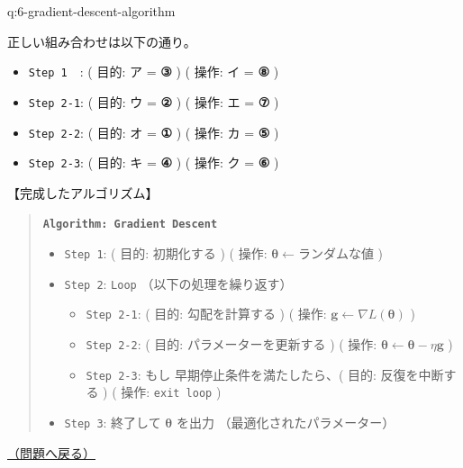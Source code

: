 \documentclass[
  pandoc]{bxjsarticle}
\providecommand{\tightlist}{%
  \setlength{\itemsep}{0pt}\setlength{\parskip}{0pt}}
\begin{document}
\begin{answerbox}[phantomlabel=a:6-gradient-descent-algorithm]{q:6-gradient-descent-algorithm}

正しい組み合わせは以下の通り。

\begin{itemize}
\tightlist
\item
  \texttt{Step\ 1}　: ( 目的: ア = \textbf{③} ) \quad ( 操作: イ =
  \textbf{⑧} )
\item
  \texttt{Step\ 2-1}: ( 目的: ウ = \textbf{②} ) \quad ( 操作: エ =
  \textbf{⑦} )
\item
  \texttt{Step\ 2-2}: ( 目的: オ = \textbf{①} ) \quad ( 操作: カ =
  \textbf{⑤} )
\item
  \texttt{Step\ 2-3}: ( 目的: キ = \textbf{④} ) \quad ( 操作: ク =
  \textbf{⑥} )
\end{itemize}

【完成したアルゴリズム】

\begin{quote}
\textbf{\texttt{Algorithm:\ Gradient\ Descent}}

\begin{itemize}
\tightlist
\item
  \texttt{Step\ 1}: ( 目的: 初期化する ) ( 操作:
  \(\boldsymbol{\theta} \leftarrow \text{ランダムな値}\) )
\item
  \texttt{Step\ 2}: \texttt{Loop} （以下の処理を繰り返す）

  \begin{itemize}
  \tightlist
  \item
    \texttt{Step\ 2-1}: ( 目的: 勾配を計算する ) ( 操作:
    \(\mathbf{g} \leftarrow \nabla L(\boldsymbol{\theta})\) )
  \item
    \texttt{Step\ 2-2}: ( 目的: パラメーターを更新する ) ( 操作:
    \(\boldsymbol{\theta} \leftarrow \boldsymbol{\theta} - \eta \mathbf{g}\)
    )
  \item
    \texttt{Step\ 2-3}: もし 早期停止条件を満たしたら、( 目的:
    反復を中断する ) ( 操作: \texttt{exit\ loop} )
  \end{itemize}
\item
  \texttt{Step\ 3}: 終了して \(\boldsymbol{\theta}\) を出力
  （最適化されたパラメーター）
\end{itemize}
\end{quote}

\hfill 

\hyperref[q:6-gradient-descent-algorithm]{（問題へ戻る）}

\end{answerbox}
\end{document}
